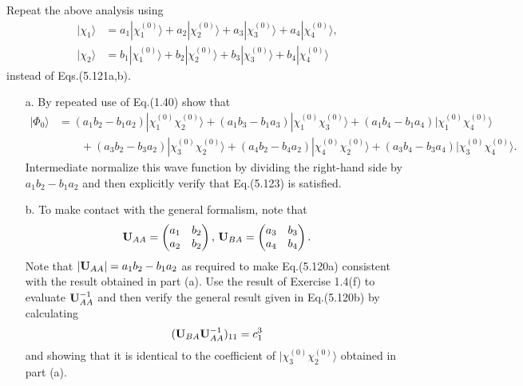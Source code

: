 \documentclass[a4paper]{book}
\newcounter{exercise}[chapter]
\newcommand{\U}{{\bf U}}
\begin{document}
	\begin{exercise}
	Repeat the above analysis using
	\begin{align*}
		| \chi_1 \rangle &= a_1 | \chi^{(0)}_1 \rangle + a_2 | \chi^{(0)}_2 \rangle + a_3 | \chi^{(0)}_3 \rangle + a_4 | \chi^{(0)}_4 \rangle, \\
		| \chi_2 \rangle &= b_1 | \chi^{(0)}_1 \rangle + b_2 | \chi^{(0)}_2 \rangle + b_3 | \chi^{(0)}_3 \rangle + b_4 | \chi^{(0)}_4 \rangle
	\end{align*}
	instead of Eqs.(5.121a,b).
	\begin{enumerate}
	
	\item[a.] By repeated use of Eq.(1.40) show that
	\begin{align*}
		| \Phi_0 \rangle &= ( a_1 b_2 - b_1 a_2 ) | \chi^{(0)}_1 \chi^{(0)}_2 \rangle + ( a_1 b_3 - b_1 a_3 ) | \chi^{(0)}_1 \chi^{(0)}_3 \rangle + ( a_1 b_4 - b_1 a_4 ) | \chi^{(0)}_1 \chi^{(0)}_4 \rangle \\
		&\hspace{2em} + ( a_3 b_2 - b_3 a_2 ) | \chi^{(0)}_3 \chi^{(0)}_2 \rangle + ( a_4 b_2 - b_4 a_2 ) | \chi^{(0)}_4 \chi^{(0)}_2 \rangle + ( a_3 b_4 - b_3 a_4 ) | \chi^{(0)}_3 \chi^{(0)}_4 \rangle .
	\end{align*}
	Intermediate normalize this wave function by dividing the right-hand side by $a_1 b_2 - b_1 a_2$ and then explicitly verify that Eq.(5.123) is satisfied.
	
	\item[b.] To make contact with the general formalism, note that
	\[
		\U_{AA} = \begin{pmatrix} a_1 & b_2 \\ a_2 & b_2 \end{pmatrix}, \, \U_{BA} = \begin{pmatrix} a_3 & b_3 \\ a_4 & b_4 \end{pmatrix}.
	\]
	Note that $|\U_{AA}| = a_1 b_2 - b_1 a_2$ as required to make Eq.(5.120a) consistent with the result obtained in part (a). Use the result of Exercise 1.4(f) to evaluate $\U^{-1}_{AA}$ and then verify the general result given in Eq.(5.120b) by calculating
	\[
		(\U_{BA}\U^{-1}_{AA})_{11} = c^3_1	
	\]
	and showing that it is identical to the coefficient of $| \chi^{(0)}_3 \chi^{(0)}_2 \rangle$ obtained in part (a).
	\end{enumerate}
	\end{exercise}
	
\end{document}

